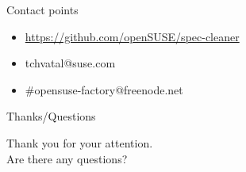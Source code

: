 \documentclass{beamer}
\begin{document}
\begin{frame}[t]{Contact points}
	\begin{itemize}
	\item \url{https://github.com/openSUSE/spec-cleaner}
	\item tchvatal@suse.com
	\item \#opensuse-factory@freenode.net 
	\end{itemize}
\end{frame}

\begin{frame}{Thanks/Questions}
	\begin{center}
	Thank you for your attention.\\
	Are there any questions?
	\end{center}
\end{frame}
\end{document}
